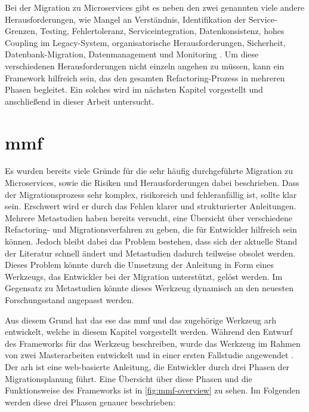 Bei der Migration zu Microservices gibt es neben den zwei genannten viele andere Her\-aus\-for\-de\-run\-gen, wie Mangel an Verständnis, Identifikation der Service-Grenzen, Testing, Fehlertoleranz, Serviceintegration, Datenkonsistenz, hohes Coupling im Legacy-System, organisatorische Her\-aus\-for\-de\-run\-gen, Sicherheit, Datenbank-Migration, Datenmanagement und Monitoring \cite{migration-challanges2023}.
Um diese verschiedenen Her\-aus\-for\-de\-run\-gen nicht einzeln angehen zu müssen, kann ein Framework hilfreich sein, das den gesamten Refactoring-Prozess in mehreren Phasen begleitet.
Ein solches wird im nächsten Kapitel vorgestellt und anschließend in dieser Arbeit untersucht.

\section{\acrfull{mmf}}
\label{sec:mmf}

Es wurden bereits viele Gründe für die sehr häufig durchgeführte Migration zu Microservices, sowie die Risiken und Herausforderungen dabei beschrieben.
Dass der Migrationsprozess sehr komplex, risikoreich und fehleranfällig ist, sollte klar sein.
Erschwert wird er durch das Fehlen klarer und strukturierter Anleitungen.
Mehrere Metastudien haben bereits versucht, eine Übersicht über verschiedene Refactoring- und Migrationsverfahren zu geben, die für Entwickler hilfreich sein können.
Jedoch bleibt dabei das Problem bestehen, dass sich der aktuelle Stand der Literatur schnell ändert und Metastudien dadurch teilweise obsolet werden.
Dieses Problem könnte durch die Umsetzung der Anleitung in Form eines Werkzeugs, das Entwickler bei der Migration unterstützt, gelöst werden.
Im Gegensatz zu Metastudien könnte dieses Werkzeug dynamisch an den neuesten Forschungsstand angepasst werden.

Aus diesem Grund hat das \gls{ese} das \acrfull{mmf} und das zugehörige Werkzeug \gls{arh} \cite{arh-github} entwickelt, welche in diesem Kapitel vorgestellt werden.
Während  den Entwurf des Frameworks für das Werkzeug beschreiben, wurde das Werkzeug im Rahmen von zwei Masterarbeiten entwickelt \cite{master-daniel-koch,master-tobias-haller} und in einer ersten Fallstudie angewendet \cite{master-marvin-knodel}.
Der \gls{arh} ist eine web-basierte Anleitung, die Entwickler durch drei Phasen der Migrationsplanung führt.
Eine Übersicht über diese Phasen und die Funktionsweise des Frameworks ist in \cref{fig:mmf-overview} zu sehen.
Im Folgenden werden diese drei Phasen genauer beschrieben:

